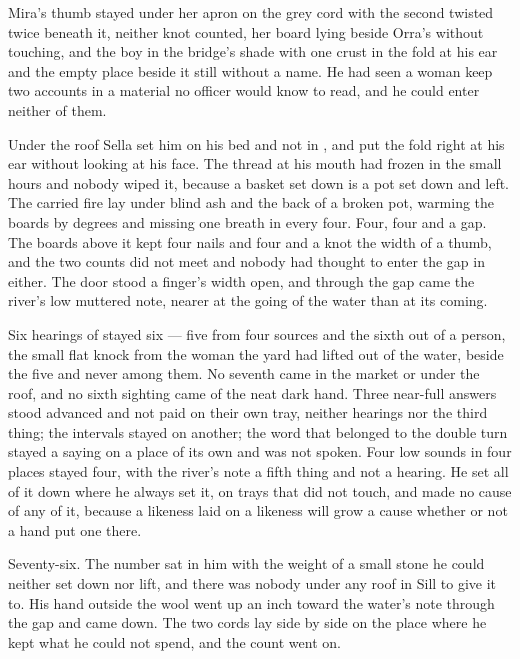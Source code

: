 Mira's thumb stayed under her apron on the grey cord with the second twisted twice beneath it, neither knot counted, her board lying beside Orra's without touching, and the boy in the bridge's shade with one crust in the fold at his ear and the empty place beside it still without a name. He had seen a woman keep two accounts in a material no officer would know to read, and he could enter neither of them.

\scenebreak

Under the  roof Sella set him on his bed and not in , and put the fold right at his ear without looking at his face. The thread at his mouth had frozen in the small hours and nobody wiped it, because a basket set down is a pot set down and left. The carried fire lay under blind ash and the back of a broken pot, warming the boards by degrees and missing one breath in every four. Four, four and a gap. The boards above it kept four nails and four and a knot the width of a thumb, and the two counts did not meet and nobody had thought to enter the gap in either. The door stood a finger's width open, and through the gap came the river's low muttered note, nearer at the going of the water than at its coming.

Six hearings of  stayed six — five from four sources and the sixth out of a person, the small flat knock from the woman the yard had lifted out of the water, beside the five and never among them. No seventh came in the market or under the roof, and no sixth sighting came of the neat dark hand. Three near-full answers stood advanced and not paid on their own tray, neither hearings nor the third thing; the intervals stayed on another; the word that belonged to the double turn stayed a saying on a place of its own and was not spoken. Four low sounds in four places stayed four, with the river's note a fifth thing and not a hearing. He set all of it down where he always set it, on trays that did not touch, and made no cause of any of it, because a likeness laid on a likeness will grow a cause whether or not a hand put one there.

Seventy-six. The number sat in him with the weight of a small stone he could neither set down nor lift, and there was nobody under any roof in Sill to give it to. His hand outside the wool went up an inch toward the water's note through the gap and came down. The two cords lay side by side on the place where he kept what he could not spend, and the count went on.
